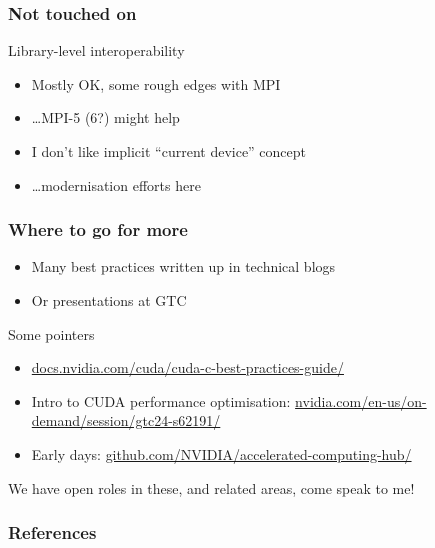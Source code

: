 \documentclass[aspectratio=169]{beamer}
\begin{document}
\begin{frame}
  \frametitle{Not touched on}
  \begin{block}{Library-level interoperability}
    \begin{itemize}
    \item Mostly OK, some rough edges with MPI
    \item \dots MPI-5 (6?) might help
    \item I don't like implicit ``current device'' concept
    \item \dots modernisation efforts here
    \end{itemize}
  \end{block}
\end{frame}
\begin{frame}
  \frametitle{Where to go for more}
  \begin{itemize}
  \item Many best practices written up in technical blogs
  \item Or presentations at GTC
  \end{itemize}
  \begin{block}{Some pointers}
    \begin{itemize}
    \item \url{docs.nvidia.com/cuda/cuda-c-best-practices-guide/}
    \item Intro to CUDA performance optimisation: \url{nvidia.com/en-us/on-demand/session/gtc24-s62191/}
    \item Early days: \url{github.com/NVIDIA/accelerated-computing-hub/}
    \end{itemize}
  \end{block}
\end{frame}
\begin{frame}
  \begin{center}
    We have open roles in these, and related areas, come speak to me!
  \end{center}
\end{frame}

\begin{frame}[t,allowframebreaks]
  \frametitle{References}
  \printbibliography[heading=none]
\end{frame}



\end{document}
